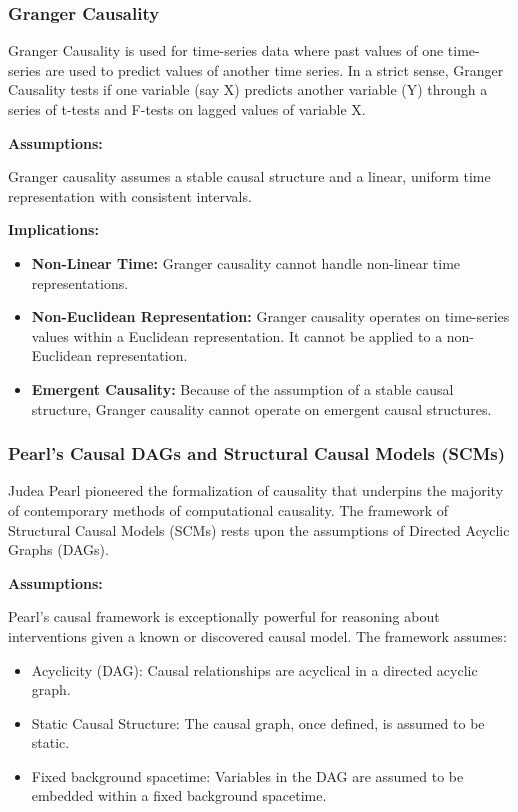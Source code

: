 \newpage

\subsubsection*{Granger Causality}

Granger Causality \cite{granger1969causal} is used for time-series data where past values of one time-series are used to predict values of another time series. In a strict sense, Granger Causality tests if one variable (say X) predicts another variable (Y) through a series of t-tests and F-tests on lagged values of variable X.

\textbf{Assumptions:}

Granger causality assumes a stable causal structure and a linear, uniform time representation with consistent intervals.

\textbf{Implications:}

\begin{itemize}
    \item \textbf{Non-Linear Time:} Granger causality cannot handle non-linear time representations.
    \item \textbf{Non-Euclidean Representation:} Granger causality operates on time-series values within a Euclidean representation. It cannot be applied to a non-Euclidean representation.
    \item \textbf{Emergent Causality:} Because of the assumption of a stable causal structure, Granger causality cannot operate on emergent causal structures.
\end{itemize}


\subsubsection*{Pearl's Causal DAGs and Structural Causal Models (SCMs)}

Judea Pearl pioneered the formalization of causality that underpins the majority of contemporary methods of computational causality. The framework of Structural Causal Models \cite{pearl2000causality} (SCMs) rests upon the assumptions of Directed Acyclic Graphs (DAGs).

\textbf{Assumptions:}

Pearl's causal framework is exceptionally powerful for reasoning about interventions given a known or discovered causal model.
The framework assumes: 

\begin{itemize}
    \item Acyclicity (DAG): Causal relationships are acyclical in a directed acyclic graph.
    \item Static Causal Structure: The causal graph, once defined, is assumed to be static.
    \item Fixed background spacetime: Variables in the DAG are assumed to be embedded within a fixed background spacetime.
\end{itemize}


